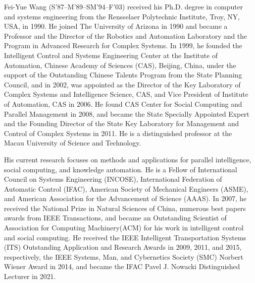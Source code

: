 \documentclass[lettersize,journal]{IEEEtran}
\begin{document}
\begin{IEEEbiography}{Fei-Yue Wang} (S’87–M’89–SM’94–F’03)
received his Ph.D. degree in computer and systems engineering from the Rensselaer Polytechnic Institute, Troy, NY, USA, in 1990. He joined The University of Arizona in 1990 and became a Professor and the Director of the Robotics and Automation Laboratory and the Program in Advanced Research for Complex Systems. In 1999, he founded the Intelligent Control and Systems Engineering Center at the Institute of Automation, Chinese Academy of Sciences (CAS), Beijing, China, under the support of the Outstanding Chinese Talents Program from the State Planning Council, and in 2002, was appointed as the Director of the Key Laboratory of Complex Systems and Intelligence Science, CAS, and Vice President of Institute of Automation, CAS in 2006. He found CAS Center for Social Computing and Parallel Management in 2008, and became the State Specially Appointed Expert and the Founding Director of the State Key Laboratory for Management and Control of Complex Systems in 2011. He is a distinguished professor at the Macau University of Science and Technology.

His current research focuses on methods and applications for parallel intelligence, social computing, and knowledge automation. He is a Fellow of International Council on Systems Engineering (INCOSE), International Federation of Automatic Control (IFAC), American Society of Mechanical Engineers (ASME), and American Association for the Advancement of Science (AAAS). In 2007, he received the National Prize in Natural Sciences of China, numerous best papers awards from IEEE Transactions, and became an Outstanding Scientist of Association for Computing Machinery(ACM) for his work in intelligent control and social computing. He received the IEEE Intelligent Transportation Systems (ITS) Outstanding Application and Research Awards in 2009, 2011, and 2015, respectively, the IEEE Systems, Man, and Cybernetics Society (SMC) Norbert Wiener Award in 2014, and became the IFAC Pavel J. Nowacki Distinguished Lecturer in 2021.


\end{IEEEbiography}
\end{document}
